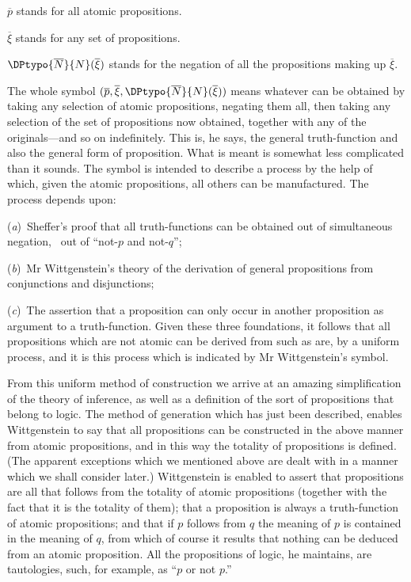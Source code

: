 $\overline{p}$ stands for all atomic propositions.

$\overline{\xi}$ stands for any set of propositions.

$\DPtypo{\overline{N}}{N}(\overline{\xi})$ stands for the negation of all the propositions
making up $\overline{\xi}$.

The whole symbol $(\overline{p}, \overline{\xi}, \DPtypo{\overline{N}}{N}(\overline{\xi}))$ means whatever can be
obtained by taking any selection of atomic propositions,
negating them all, then taking any selection of the set
of propositions now obtained, together with any of the
originals---and so on indefinitely. This is, he says, the
general truth-function and also the general form of proposition.
What is meant is somewhat less complicated
than it sounds. The symbol is intended to describe a
process by the help of which, given the atomic propositions,
all others can be manufactured. The process depends
upon:

(\textit{a})~Sheffer's proof that all truth-functions can be
obtained out of simultaneous negation, \idEst\ out of ``not-$p$
and not-$q$'';

(\textit{b})~Mr Wittgenstein's theory of the derivation of
general propositions from conjunctions and disjunctions;

(\textit{c})~The assertion that a proposition can only occur in
another proposition as argument to a truth-function.
Given these three foundations, it follows that all propositions
which are not atomic can be derived from such
as are, by a uniform process, and it is this process which
is indicated by Mr Wittgenstein's symbol.

From this uniform method of construction we arrive
at an amazing simplification of the theory of inference,
as well as a definition of the sort of propositions that
belong to logic. The method of generation which has
just been described, enables Wittgenstein to say that all
propositions can be constructed in the above manner from
atomic propositions, and in this way the totality of propositions
is defined. (The apparent exceptions which we
mentioned above are dealt with in a manner which we
shall consider later.) Wittgenstein is enabled to assert
that propositions are all that follows from the totality of
atomic propositions (together with the fact that it is the
totality of them); that a proposition is always a truth-function
of atomic propositions; and that if $p$ follows from
$q$ the meaning of $p$ is contained in the meaning of $q$, from
which of course it results that nothing can be deduced
from an atomic proposition. All the propositions of logic,
he maintains, are tautologies, such, for example, as ``$p$
or not $p$.''

